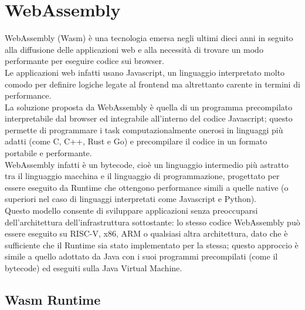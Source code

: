 \section{WebAssembly}
\label{sec:webassembly}

WebAssembly\cite{WasmSpec24} (Wasm) è una tecnologia emersa negli ultimi dieci anni in seguito alla diffusione delle applicazioni web e alla necessità di trovare un modo performante per eseguire codice sui browser.\\
Le applicazioni web infatti usano Javascript, un linguaggio interpretato molto comodo per definire logiche legate al frontend ma altrettanto carente in termini di performance.\\
La soluzione proposta da WebAssembly è quella di un programma precompilato interpretabile dal browser ed integrabile all'interno del codice Javascript; questo permette di programmare i task computazionalmente onerosi in linguaggi più adatti (come C, C++, Rust e Go) e precompilare il codice in un formato portabile e performante.\\
WebAssembly infatti è un bytecode, cioè un linguaggio intermedio più astratto tra il linguaggio macchina e il linguaggio di programmazione, progettato per essere eseguito da Runtime che ottengono performance simili a quelle native (o superiori nel caso di linguaggi interpretati come Javascript e Python).\\
Questo modello consente di sviluppare applicazioni senza preoccuparsi dell'architettura dell'infrastruttura sottostante: lo stesso codice WebAssembly può essere eseguito su RISC-V, x86, ARM o qualsiasi altra architettura, dato che è sufficiente che il Runtime sia stato implementato per la stessa; questo approccio è simile a quello adottato da Java con i suoi programmi precompilati (come il bytecode) ed eseguiti sulla Java Virtual Machine.

\subsection{Wasm Runtime}

